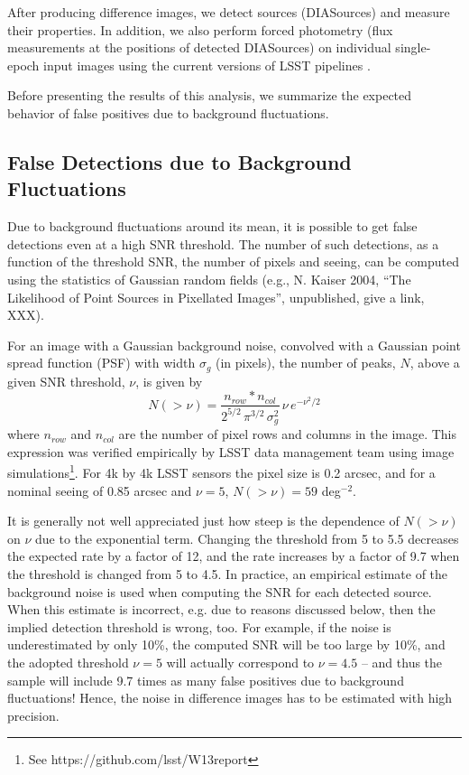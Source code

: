 After producing difference images, we detect sources (DIASources) and measure
their properties. In addition, we also perform forced photometry (flux measurements 
at the positions of detected DIASources) on individual single-epoch input images 
using the current versions of LSST pipelines \citep{juric15}. 

Before presenting the results of this analysis, we summarize the expected behavior
of false positives due to background fluctuations. 


\subsection{False Detections due to Background Fluctuations \label{sec:kaiser}}

Due to background fluctuations around its mean, it is possible to get false
detections even at a high SNR threshold. The number of 
such detections, as a function of the threshold SNR, the number of pixels and 
seeing, can be computed using the statistics of Gaussian random fields (e.g., 
N. Kaiser 2004, ``The Likelihood of Point Sources in Pixellated Images'', unpublished,
give a link, XXX). 

For an image with a Gaussian background noise, convolved with a Gaussian point 
spread function (PSF) with width $\sigma_g$ (in pixels), the number of peaks, $N$, above a 
given SNR threshold, $\nu$, is given by 
\begin{equation}
N(>\nu)  = \frac{n_{row}*n_{col}}{2^{5/2} \, \pi^{3/2} \, \sigma_g^2} \, \nu \, e^{-\nu^2 /2} 
\label{eq-theory}
\end{equation}
where $n_{row}$ and $n_{col}$ are the number of pixel rows and columns in the image. 
This expression was verified empirically by LSST data management team using 
image simulations\footnote{See https://github.com/lsst/W13report}.
For 4k by 4k LSST sensors the pixel size is 0.2 arcsec, and for a nominal seeing
of 0.85 arcsec and $\nu=5$, $N(>\nu) = 59$ deg$^{-2}$. 

It is generally not well appreciated just how steep is the dependence of $N(>\nu)$
on $\nu$ due to the exponential term. Changing the threshold from 5 to 5.5
decreases the expected rate by a factor of 12, and the rate increases by a factor
of 9.7 when the threshold is changed from 5 to 4.5. In practice, an empirical estimate 
of the background noise is used when computing the SNR for each detected source.
When this estimate is incorrect, e.g. due to reasons discussed below, then the 
implied detection threshold is wrong, too. For example, if the noise is underestimated
by only 10\%, the computed SNR will be too large by 10\%, and the adopted 
threshold $\nu=5$ will actually correspond to $\nu=4.5$ -- and thus the 
sample will include 9.7 times as many false positives due to background 
fluctuations! Hence, the noise in difference images has to be estimated with
high precision. 


